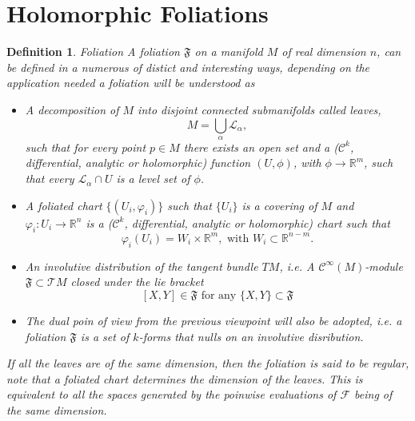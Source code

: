 \documentclass[12pt,twoside,a4paper]{report}
\newtheorem{definition}{Definition}[section]
\newcommand{\re}{\ensuremath{\mathbb R }}
\begin{document}
\section{Holomorphic Foliations}

\begin{definition}{Foliation}
A foliation $\mathfrak{F}$ on a manifold $M$ of real dimension $n$, can be defined in a numerous of distict and interesting ways, depending on the application needed a foliation will be understood as
\begin{itemize}
  \item A decomposition of $M$ into disjoint connected submanifolds called \emph{leaves},
        \[
          M=\bigcup_{\alpha}\mathcal{L_{\alpha}},
        \]
        \noindent such that for every point $p\in M$ there exists an open set and a ($\mathcal{C}^{k}$, differential, analytic or holomorphic) function $(U,\phi)$, with $\phi\rightarrow\re^{m}$, such that every $\mathcal{L}_{\alpha}\cap U$ is a level set of $\phi$.
  \item A \emph{foliated chart} $\{(U_{i},\varphi_{i})\}$ such that $\{U_{i}\}$ is a covering of $M$ and $\varphi_{i}:U_{i}\rightarrow\re^{n}$ is a ($\mathcal{C}^{k}$, differential, analytic or holomorphic) chart such that
        \[
          \varphi_{i}(U_{i})=W_{i}\times\re^{m},\text{ with }W_{i}\subset\re^{n-m}.
        \]
      \item An \emph{involutive} distribution of the tangent bundle $TM$, i.e. A $\mathcal{C}^{\infty}(M)$-module $\mathfrak{F}\subset\mathcal{T}M$ closed under the lie bracket
        \[
          [X,Y]\in\mathfrak{F}\text{ for any } \{X,Y\}\subset\mathfrak{F}
        \]
  \item The dual poin of view from the previous viewpoint will also be adopted, i.e. a foliation $\mathfrak{F}$ is a set of $k$-forms that nulls on an involutive disribution.
\end{itemize}

If all the leaves are of the same dimension, then the foliation is said to be \emph{regular}, note that a foliated chart determines the dimension of the leaves. This is equivalent to all the spaces generated by the poinwise evaluations of $\mathcal{F}$ being of the same dimension.
\end{definition}
\end{document}
